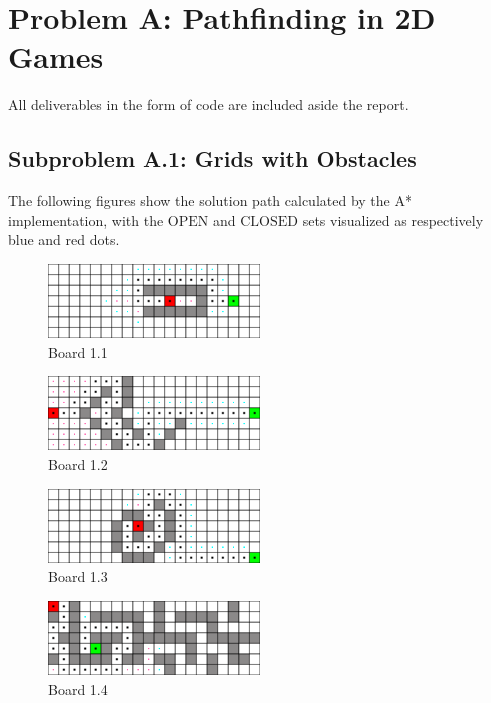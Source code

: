 \section{Problem A: Pathfinding in 2D Games}

All deliverables in the form of code are included aside the report.

\subsection*{Subproblem A.1: Grids with Obstacles}

The following figures show the solution path calculated by the A* implementation,
with the $\text{OPEN}$ and $\text{CLOSED}$ sets visualized as respectively blue
and red dots.

\begin{figure}[h!]
  \centering
    \includegraphics[width=0.5\textwidth]{img/board-1-1-astar}
    \caption{Board 1.1}
\end{figure}

\begin{figure}[h!]
  \centering
    \includegraphics[width=0.5\textwidth]{img/board-1-2-astar}
    \caption{Board 1.2}
\end{figure}

\begin{figure}[h!]
  \centering
    \includegraphics[width=0.5\textwidth]{img/board-1-3-astar}
    \caption{Board 1.3}
\end{figure}

\begin{figure}[h!]
  \centering
    \includegraphics[width=0.5\textwidth]{img/board-1-4-astar}
    \caption{Board 1.4}
\end{figure}

